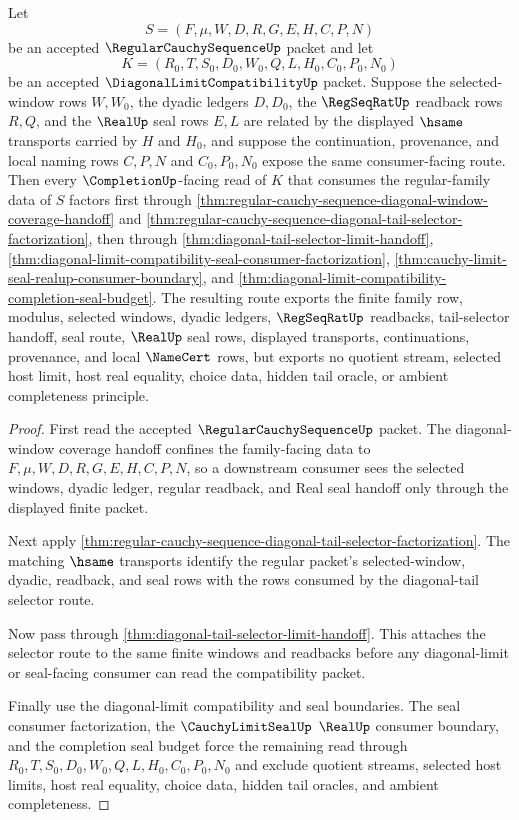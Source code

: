 \begin{theorem}
\label{thm:diagonal-limit-compatibility-regular-cauchy-sequence-handoff}
Let
$$
S=(F,\mu,W,D,R,G,E,H,C,P,N)
$$
be an accepted $\RegularCauchySequenceUp$ packet and let
$$
K=(R_0,T,S_0,D_0,W_0,Q,L,H_0,C_0,P_0,N_0)
$$
be an accepted $\DiagonalLimitCompatibilityUp$ packet. Suppose the selected-window rows $W,W_0$, the dyadic ledgers $D,D_0$, the $\RegSeqRatUp$ readback rows $R,Q$, and the $\RealUp$ seal rows $E,L$ are related by the displayed $\hsame$ transports carried by $H$ and $H_0$, and suppose the continuation, provenance, and local naming rows $C,P,N$ and $C_0,P_0,N_0$ expose the same consumer-facing route. Then every $\CompletionUp$-facing read of $K$ that consumes the regular-family data of $S$ factors first through \autoref{thm:regular-cauchy-sequence-diagonal-window-coverage-handoff} and \autoref{thm:regular-cauchy-sequence-diagonal-tail-selector-factorization}, then through \autoref{thm:diagonal-tail-selector-limit-handoff}, \autoref{thm:diagonal-limit-compatibility-seal-consumer-factorization}, \autoref{thm:cauchy-limit-seal-realup-consumer-boundary}, and \autoref{thm:diagonal-limit-compatibility-completion-seal-budget}. The resulting route exports the finite family row, modulus, selected windows, dyadic ledgers, $\RegSeqRatUp$ readbacks, tail-selector handoff, seal route, $\RealUp$ seal rows, displayed transports, continuations, provenance, and local $\NameCert$ rows, but exports no quotient stream, selected host limit, host real equality, choice data, hidden tail oracle, or ambient completeness principle.
\end{theorem}
\begin{proof}
First read the accepted $\RegularCauchySequenceUp$ packet. The diagonal-window coverage handoff confines the family-facing data to $F,\mu,W,D,R,G,E,H,C,P,N$, so a downstream consumer sees the selected windows, dyadic ledger, regular readback, and Real seal handoff only through the displayed finite packet.

Next apply \autoref{thm:regular-cauchy-sequence-diagonal-tail-selector-factorization}. The matching $\hsame$ transports identify the regular packet's selected-window, dyadic, readback, and seal rows with the rows consumed by the diagonal-tail selector route.

Now pass through \autoref{thm:diagonal-tail-selector-limit-handoff}. This attaches the selector route to the same finite windows and readbacks before any diagonal-limit or seal-facing consumer can read the compatibility packet.

Finally use the diagonal-limit compatibility and seal boundaries. The seal consumer factorization, the $\CauchyLimitSealUp$ $\RealUp$ consumer boundary, and the completion seal budget force the remaining read through $R_0,T,S_0,D_0,W_0,Q,L,H_0,C_0,P_0,N_0$ and exclude quotient streams, selected host limits, host real equality, choice data, hidden tail oracles, and ambient completeness.
\end{proof}

